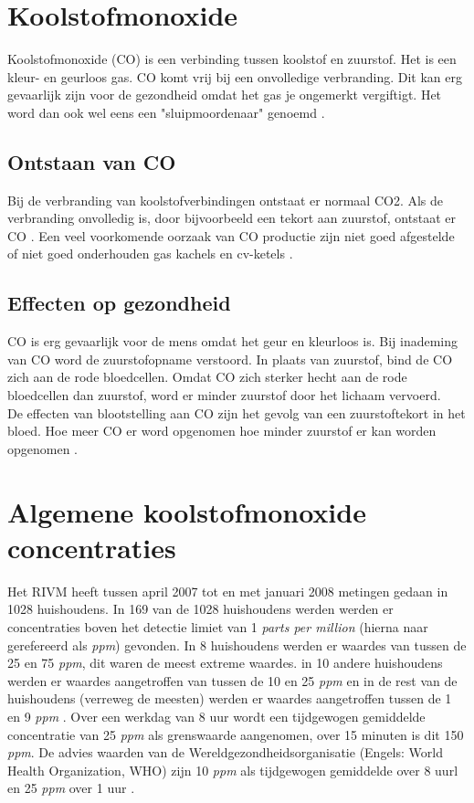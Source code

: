 \documentclass[a4paper, 11pt]{article} %
\begin{document}
	\section{Koolstofmonoxide} \label{sec::CO}
	Koolstofmonoxide (CO) is een verbinding tussen koolstof en zuurstof. Het is een kleur- en geurloos gas. CO komt vrij bij een onvolledige verbranding. Dit kan erg gevaarlijk zijn voor de gezondheid omdat het gas je ongemerkt vergiftigt. Het word dan ook wel eens een "sluipmoordenaar" genoemd \cite{Effecten Koolmonoxide}. 
	
	\subsection{Ontstaan van CO} \label{subsec::ontstaan_CO}
	Bij de verbranding van koolstofverbindingen ontstaat er normaal CO2. Als de verbranding onvolledig is, door bijvoorbeeld een tekort aan zuurstof, ontstaat er CO \cite{Effecten Koolmonoxide}. Een veel voorkomende oorzaak van CO productie zijn niet goed afgestelde of niet goed onderhouden gas kachels en cv-ketels \cite{RIVM huurwoningen}.
	
	\subsection{Effecten op gezondheid} \label{subsec::CO_gezondheid}
	CO is erg gevaarlijk voor de mens omdat het geur en kleurloos is. Bij inademing van CO word de zuurstofopname verstoord. In plaats van zuurstof, bind de CO zich aan de rode bloedcellen. Omdat CO zich sterker hecht aan de rode bloedcellen dan zuurstof, word er minder zuurstof door het lichaam vervoerd. 
	\\
	De effecten van blootstelling aan CO zijn het gevolg van een zuurstoftekort in het bloed. Hoe meer CO er word opgenomen hoe minder zuurstof er kan worden opgenomen \cite{Effecten Koolmonoxide}. 
	
	\section{Algemene koolstofmonoxide concentraties} \label{sec::CO_concentraties}
	Het RIVM heeft tussen april 2007 tot en met januari 2008 metingen gedaan in 1028 huishoudens. In 169 van de 1028 huishoudens werden werden er concentraties boven het detectie limiet van 1 \textit{parts per million} (hierna naar gerefereerd als \textit{ppm}) gevonden. In 8 huishoudens werden er waardes van tussen de 25 en 75 \textit{ppm}, dit waren de meest extreme waardes. in 10 andere huishoudens werden er waardes aangetroffen van tussen de 10 en 25 \textit{ppm} en in de rest van de huishoudens (verreweg de meesten) werden er waardes aangetroffen tussen de 1 en 9 \textit{ppm} \cite{RIVM huurwoningen}. Over een werkdag van 8 uur wordt een tijdgewogen gemiddelde concentratie van 25 \textit{ppm} als grenswaarde aangenomen, over 15 minuten is dit 150 \textit{ppm}. De advies waarden van de Wereldgezondheidsorganisatie (Engels: World Health Organization, WHO) zijn 10 \textit{ppm} als tijdgewogen gemiddelde over 8 uurl en 25 \textit{ppm} over 1 uur \cite{Blootstelling aan CO}.
	
\end{document}

